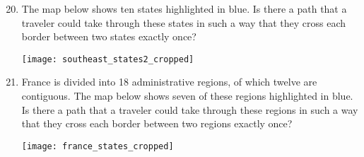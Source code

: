 \begin{enumerate}
\setcounter{enumi}{19}

\item The map below shows ten states highlighted in blue.  Is there a path that a traveler could take through these states in such a way that they cross each border between two states exactly once?
\begin{center}
\texttt{[image: southeast\_states2\_cropped]}
\end{center} \text{} 

\item France is divided into 18 administrative regions, of which twelve are contiguous.  The map below shows seven of these regions highlighted in blue.  Is there a path that a traveler could take through these regions in such a way that they cross each border between two regions exactly once?
\begin{center}
\texttt{[image: france\_states\_cropped]}
\end{center} \text{} 
\end{enumerate}

